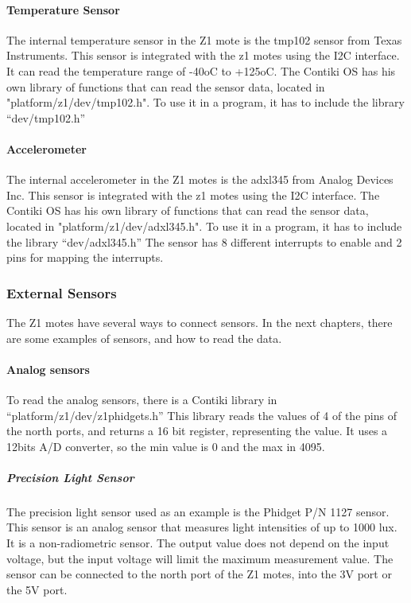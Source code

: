\paragraph{Temperature Sensor}

The internal temperature sensor in the Z1 mote is the tmp102 sensor from Texas Instruments.
This sensor is integrated with the z1 motes using the I2C interface.
It can read the temperature range of -40oC to +125oC.
The Contiki OS has his own library of functions that can read the sensor data,
	located in "platform/z1/dev/tmp102.h".
To use it in a program,
	it has to include the library “dev/tmp102.h” 

\paragraph{Accelerometer}
The internal accelerometer in the Z1 motes is the adxl345 from Analog Devices Inc.
This sensor is integrated with the z1 motes using the I2C interface.
The Contiki OS has his own library of functions that can read the sensor data,
	located in "platform/z1/dev/adxl345.h".
To use it in a program,
	it has to include the library “dev/adxl345.h” The sensor has 8 different interrupts to enable and 2 pins for mapping the interrupts.

\subsubsection{External Sensors}
The Z1 motes have several ways to connect sensors.
In the next chapters,
	there are some examples of sensors,
	and how to read the data.

\paragraph{Analog sensors}

To read the analog sensors,
	there is a Contiki library in “platform/z1/dev/z1phidgets.h” This library reads the values of 4 of the pins of the north ports,
	and returns a 16 bit register,
	representing the value.
It uses a 12bits A/D converter,
	so the min value is 0 and the max in 4095.


\subparagraph{Precision Light Sensor}
The precision light sensor used as an example is the Phidget P/N 1127 sensor.
This sensor is an analog sensor that measures light intensities of up to 1000 lux.
It is a non-radiometric sensor.
The output value does not depend on the input voltage,
	but the input voltage will limit the maximum measurement value.
The sensor can be connected to the north port of the Z1 motes,
	into the 3V port or the 5V port.

